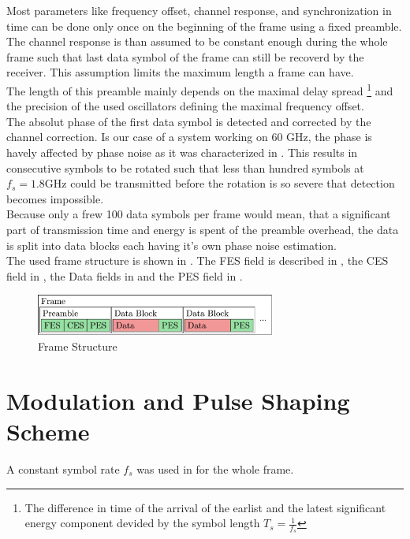 Most parameters like frequency offset, channel response, and
synchronization in time can be done only once on the beginning of the
frame using a fixed preamble.
The channel response is than assumed to be constant enough during
the whole frame such that last data symbol of the frame can still be
recoverd by the receiver. This assumption limits the maximum length a frame
can have. \\

The length of this preamble mainly depends on the maximal delay spread
\footnote{The difference in time of the arrival of the earlist and the
  latest significant energy component devided by the symbol length
  $T_s = \frac{1}{f_s}$} and the precision of the used oscillators defining
the maximal frequency offset. \\

The absolut phase of the first data symbol is detected and corrected by the
channel correction. Is our case of a system working on 60 GHz, the
phase is havely affected by phase noise as it was characterized in
. This results in consecutive symbols to be
rotated such that less than hundred symbols at $f_s = 1.8 \text{GHz}$
could be transmitted before the rotation is so severe that detection
becomes impossible. \\

Because only a frew 100 data symbols per frame would mean,
that a significant part of transmission time and energy is spent
of the preamble overhead, the data is split into data blocks each having
it's own phase noise estimation. \\

The used frame structure is shown in .
The \gls{FES} field is described in ,
the \gls{CES} field in ,
the Data fields in  and the
\gls{PES} field in .

\begin{figure}[ht]
  \centering
  \includegraphics[width=0.7\textwidth]{figures/frame_struct}
  \caption{Frame Structure}
  \label{fig:sys_frame_struct}
\end{figure}

\section{Modulation and Pulse Shaping Scheme}
A constant symbol rate $f_s$ was used in for the whole frame. \\


